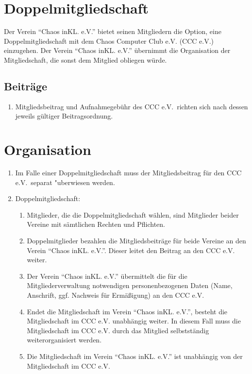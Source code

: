 \documentclass[a4paper, 12pt]{scrartcl}
\begin{document}
\section{Doppelmitgliedschaft}\label{dm}
Der Verein "`Chaos inKL. e.V."' bietet seinen Mitgliedern die Option, eine Doppelmitgliedschaft mit dem Chaos Computer Club e.V. (CCC e.V.) einzugehen. Der Verein "`Chaos inKL. e.V."' übernimmt die Organisation der Mitgliedschaft, die sonst dem Mitglied obliegen würde.

\subsection{Beiträge}\label{dmbeitrag}
\begin{enumerate}
	\item Mitgliedsbeitrag und Aufnahmegebühr des CCC e.V.\ richten sich nach dessen jeweils gültiger Beitragsordnung.
\end{enumerate}

\section{Organisation}
\begin{enumerate}
	\item Im Falle einer Doppelmitgliedschaft muss der Mitgliedsbeitrag für den CCC e.V.\ separat "uberwiesen werden.
	\item Doppelmitgliedschaft:
\begin{enumerate}
	\item Mitglieder, die die Doppelmitgliedschaft wählen, sind Mitglieder beider Vereine mit sämtlichen Rechten und Pflichten.
	\item Doppelmitglieder bezahlen die Mitgliedsbeiträge für beide Vereine an den Verein "`Chaos inKL. e.V."'. Dieser leitet den Beitrag an den CCC e.V. weiter.
	\item Der Verein "`Chaos inKL. e.V."' übermittelt die für die Mitgliederverwaltung notwendigen personenbezogenen Daten (Name, Anschrift, ggf. Nachweis für Ermäßigung) an den CCC e.V.
	\item Endet die Mitgliedschaft im Verein "`Chaos inKL. e.V."', besteht die Mitgliedschaft im CCC e.V. unabhängig weiter. In diesem Fall muss die Mitgliedschaft im CCC e.V. durch das Mitglied selbstständig weiterorganisiert werden.
	\item Die Mitgliedschaft im Verein "`Chaos inKL. e.V."' ist unabhängig von der Mitgliedschaft im CCC e.V.
\end{enumerate}
\end{enumerate}
\end{document}
